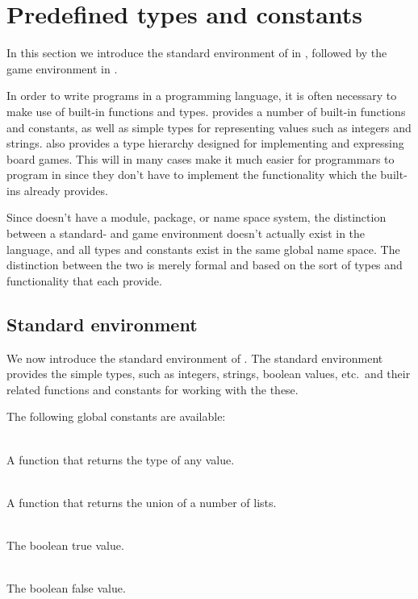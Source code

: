 \section{Predefined types and constants}
\label{sec:predefined}

In this section we introduce the standard environment of \productname{} in
, followed by the game environment in
.

In order to write programs in a programming language, it is often necessary to
make use of built-in functions and types. \productname{} provides a number of
built-in functions and constants, as well as simple types for representing
values such as integers and strings. \productname{} also provides a type
hierarchy designed for implementing and expressing board games. This will in
many cases make it much easier for programmars to program in \productname{}
since they don't have to implement the functionality which the built-ins already
provides.

Since \productname{} doesn't have a module, package, or name space system, the
distinction between a standard- and game environment doesn't actually exist in
the language, and all types and constants exist in the same global name space.
The distinction between the two is merely formal and based on the sort of types
and functionality that each provide.
 
\subsection{Standard environment}
\label{sec:standardenvironment}

We now introduce the standard environment of \productname{}. The standard
environment provides the simple types, such as integers, strings, boolean
values, etc.\ and their related functions and constants for working with the
these.

The following global constants are available:

\begin{dlist}
  \item {}\\
    A function that returns the type of any value.
  \item {}\\
    A function that returns the union of a number of lists.
  \item {}\\
    The boolean true value.
  \item {}\\
    The boolean false value.
\end{dlist}

